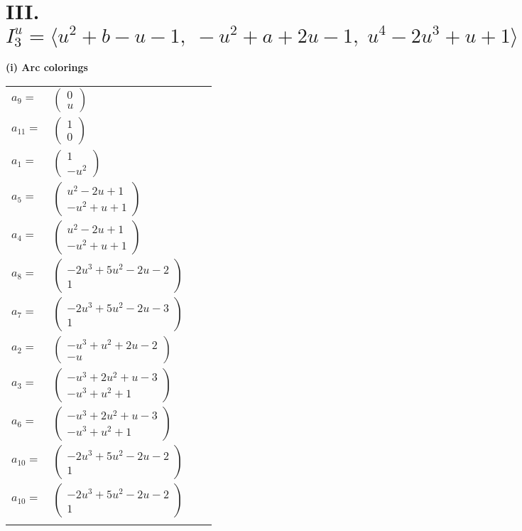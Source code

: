\documentclass[1p]{elsarticle_modified}
\theoremstyle{definition}
\begin{document}
\centering \section*{III. $I^u_{3}= \langle u^2+b- u-1,\;- u^2+a+2 u-1,\;u^4-2 u^3+u+1 \rangle$}
\flushleft \textbf{(i) Arc colorings}\\
\begin{tabular}{m{7pt} m{180pt} m{7pt} m{180pt} }
\flushright $a_{9}=$&$\begin{pmatrix}0\\u\end{pmatrix}$ \\
\flushright $a_{11}=$&$\begin{pmatrix}1\\0\end{pmatrix}$ \\
\flushright $a_{1}=$&$\begin{pmatrix}1\\- u^2\end{pmatrix}$ \\
\flushright $a_{5}=$&$\begin{pmatrix}u^2-2 u+1\\- u^2+u+1\end{pmatrix}$ \\
\flushright $a_{4}=$&$\begin{pmatrix}u^2-2 u+1\\- u^2+u+1\end{pmatrix}$ \\
\flushright $a_{8}=$&$\begin{pmatrix}-2 u^3+5 u^2-2 u-2\\1\end{pmatrix}$ \\
\flushright $a_{7}=$&$\begin{pmatrix}-2 u^3+5 u^2-2 u-3\\1\end{pmatrix}$ \\
\flushright $a_{2}=$&$\begin{pmatrix}- u^3+u^2+2 u-2\\- u\end{pmatrix}$ \\
\flushright $a_{3}=$&$\begin{pmatrix}- u^3+2 u^2+u-3\\- u^3+u^2+1\end{pmatrix}$ \\
\flushright $a_{6}=$&$\begin{pmatrix}- u^3+2 u^2+u-3\\- u^3+u^2+1\end{pmatrix}$ \\
\flushright $a_{10}=$&$\begin{pmatrix}-2 u^3+5 u^2-2 u-2\\1\end{pmatrix}$\\ \flushright $a_{10}=$&$\begin{pmatrix}-2 u^3+5 u^2-2 u-2\\1\end{pmatrix}$\\&\end{tabular}
\end{document}
